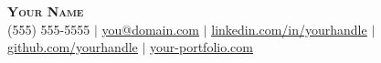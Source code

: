 \begin{center}
  \textbf{\Huge \scshape Your Name} \\ \vspace{1pt}
  \small (555) 555-5555 $|$ \href{mailto:you@domain.com}{\underline{you@domain.com}} $|$
  \href{https://www.linkedin.com/in/yourhandle}{\underline{linkedin.com/in/yourhandle}} $|$
  \href{https://github.com/yourhandle}{\underline{github.com/yourhandle}} $|$
  \href{https://your-portfolio.com}{\underline{your-portfolio.com}}
\end{center}